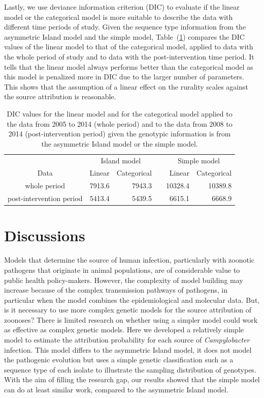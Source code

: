 \documentclass[times, doublespace]{simauth}%
\begin{document}
Lastly, we use deviance information criterion (DIC) to evaluate if the linear model or the categorical model is more suitable to describe the data with different time periods of study. Given the sequence type information from the asymmetric Island model and the simple model, Table~(\ref{tab3}) compares the DIC values of the linear model to that of the categorical model, applied to data with the whole period of study and to data with the post-intervention time period. It tells that the linear model always performs better than the categorical model as this model is penalized more in DIC due to the larger number of parameters. This shows that the assumption of a linear effect on the rurality scales against the source attribution is reasonable. 

\begin{table}
  \begin{center}
    \begin{tabular}{crrrrr}
      \toprule
      & \multicolumn{2}{c}{Island model}  & \multicolumn{1}{c}{} & \multicolumn{2}{c}{Simple model} \\
      Data & Linear & Categorical & & Linear & Categorical\\ \midrule
      whole period  & 7913.6 & 7943.3  & & 10328.4  & 10389.8 \\
      post-intervention period  & 5413.4  & 5439.5  & & 6615.1   & 6668.9 \\
      \bottomrule
    \end{tabular}
  \end{center}
  \caption{DIC values for the linear model and for the categorical model applied to the data from 2005 to 2014 (whole period) and to the data from 2008 to 2014 (post-intervention period) given the genotypic information is from the asymmetric Island model or the simple model.}
  \label{tab3}
\end{table}

\section{Discussions}
Models that determine the source of human infection, particularly with zoonotic pathogens that originate in animal populations, are of considerable value to public health policy-makers. However, the complexity of model building may increase because of the complex transmission pathways of pathogens, in particular when the model combines the epidemiological and molecular data. But, is it necessary to use more complex genetic models for the source attribution of zoonoses? There is limited research on whether using a simpler model could work as effective as complex genetic models. Here we developed a relatively simple model to estimate the attribution probability for each source of \textit{Campylobacter} infection. This model differs to the asymmetric Island model, it does not model the pathogenic evolution but uses a simple genetic classification such as a sequence type of each isolate to illustrate the sampling distribution of genotypes. With the aim of filling the research gap, our results showed that the simple model can do at least similar work, compared to the asymmetric Island model.
\end{document}

